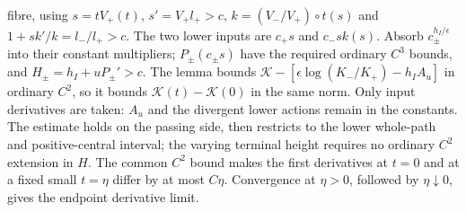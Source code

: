 fibre, using $s=tV_+(t)$, $s'=V_+l_+>c$,
$k=(V_-/V_+)\circ t(s)$ and $1+sk'/k=l_-/l_+>c$.
The two lower inputs are $c_+s$ and
$c_-sk(s)$. Absorb $c_\pm^{h_I/\epsilon}$ into their constant
multipliers; $P_\pm(c_\pm s)$ have the required ordinary $C^3$ bounds,
and $H_\pm=h_I+uP_\pm'>c$. The lemma bounds
$\mathcal K-[\epsilon\log(K_-/K_+)-h_IA_u]$ in ordinary $C^2$,
so it bounds $\mathcal K(t)-\mathcal K(0)$ in the same norm.
Only input derivatives are taken: $A_u$ and the divergent lower actions
remain in the constants. The estimate holds on
the passing side, then restricts to the lower whole-path and
positive-central interval; the varying terminal height requires no
ordinary $C^2$ extension in $H$. The common $C^2$ bound makes the
first derivatives at $t=0$ and at a fixed small $t=\eta$ differ by
at most $C\eta$. Convergence at $\eta>0$, followed by
$\eta\downarrow0$, gives the endpoint derivative limit.
